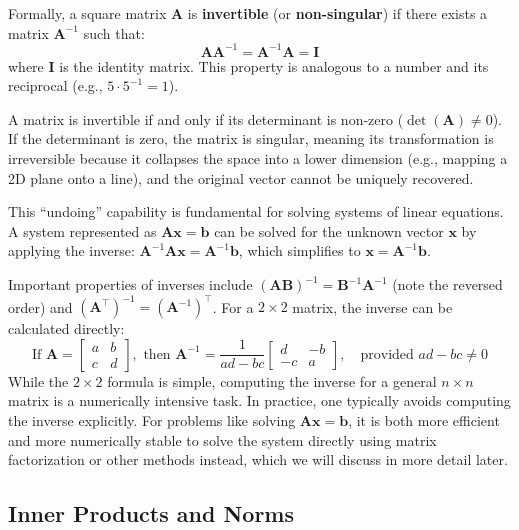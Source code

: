 Formally, a square matrix $ \mathbf{A} $ is \textbf{invertible} (or \textbf{non-singular}) if there exists a matrix $ \mathbf{A}^{-1} $ such that:
\begin{equation*}
    \mathbf{A}\mathbf{A}^{-1} = \mathbf{A}^{-1}\mathbf{A} = \mathbf{I}
\end{equation*}
where $ \mathbf{I} $ is the identity matrix. This property is analogous to a number and its reciprocal (e.g., $ 5 \cdot 5^{-1} = 1 $).

A matrix is invertible if and only if its determinant is non-zero ($ \det(\mathbf{A}) \neq 0 $). If the determinant is zero, the matrix is singular, meaning its transformation is irreversible because it collapses the space into a lower dimension (e.g., mapping a 2D plane onto a line), and the original vector cannot be uniquely recovered.

This ``undoing'' capability is fundamental for solving systems of linear equations. A system represented as $ \mathbf{A}\mathbf{x} = \mathbf{b} $ can be solved for the unknown vector $ \mathbf{x} $ by applying the inverse: $ \mathbf{A}^{-1}\mathbf{A}\mathbf{x} = \mathbf{A}^{-1}\mathbf{b} $, which simplifies to $ \mathbf{x} = \mathbf{A}^{-1}\mathbf{b} $.

Important properties of inverses include $(\mathbf{A}\mathbf{B})^{-1} = \mathbf{B}^{-1}\mathbf{A}^{-1}$ (note the reversed order) and $(\mathbf{A}^\top)^{-1} = (\mathbf{A}^{-1})^\top$. For a $2\times 2$ matrix, the inverse can be calculated directly:
\begin{equation*}
    \text{If } \mathbf{A} = \begin{bmatrix} a & b \\ c & d \end{bmatrix}, \text{ then } \mathbf{A}^{-1} = \frac{1}{ad-bc} \begin{bmatrix} d & -b \\ -c & a \end{bmatrix}, \quad \text{provided } ad-bc \neq 0
\end{equation*}
While the $2 \times 2$ formula is simple, computing the inverse for a general $n \times n$ matrix is a numerically intensive task. In practice, one typically avoids computing the inverse explicitly. For problems like solving $\mathbf{A}\mathbf{x} = \mathbf{b}$, it is both more efficient and more numerically stable to solve the system directly using matrix factorization or other methods instead, which we will discuss in more detail later.

\subsection{Inner Products and Norms}

